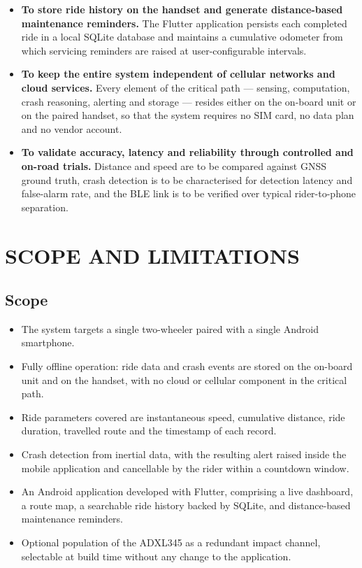 \documentclass[12pt,a4paper,oneside]{report}
\begin{document}
\begin{itemize}[leftmargin=*,itemsep=0.7em,topsep=0.7em]
\item \textbf{To store ride history on the handset and generate distance-based maintenance
reminders.} The Flutter application persists each completed ride in a local SQLite database
and maintains a cumulative odometer from which servicing reminders are raised at
user-configurable intervals.

\item \textbf{To keep the entire system independent of cellular networks and cloud
services.} Every element of the critical path --- sensing, computation, crash reasoning,
alerting and storage --- resides either on the on-board unit or on the paired handset, so
that the system requires no SIM card, no data plan and no vendor account.

\item \textbf{To validate accuracy, latency and reliability through controlled and on-road
trials.} Distance and speed are to be compared against GNSS ground truth, crash detection
is to be characterised for detection latency and false-alarm rate, and the BLE link is to be
verified over typical rider-to-phone separation.
\end{itemize}

\section{SCOPE AND LIMITATIONS}

\subsection{Scope}

\begin{itemize}[leftmargin=*,itemsep=0.45em,topsep=0.6em]
\item The system targets a single two-wheeler paired with a single Android smartphone.

\item Fully offline operation: ride data and crash events are stored on the on-board unit
and on the handset, with no cloud or cellular component in the critical path.

\item Ride parameters covered are instantaneous speed, cumulative distance, ride duration,
travelled route and the timestamp of each record.

\item Crash detection from inertial data, with the resulting alert raised inside the mobile
application and cancellable by the rider within a countdown window.

\item An Android application developed with Flutter, comprising a live dashboard, a route
map, a searchable ride history backed by SQLite, and distance-based maintenance reminders.

\item Optional population of the ADXL345 as a redundant impact channel, selectable at build
time without any change to the application.
\end{itemize}
\end{document}
